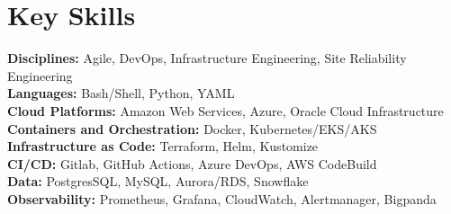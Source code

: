 \documentclass[letterpaper,10.5pt]{article}
\makeatletter
\newcommand{\resumeItem}[1]{
  \item\small{
    {#1 \vspace{-2pt}}
  }
}
\newcommand{\resumeProjectHeading}[2]{
    \vspace{-2pt}\item
    \begin{tabular*}{0.97\textwidth}{l@{\extracolsep{\fill}}r}
      \small#1 & #2 \\
    \end{tabular*}\vspace{-7pt}
}
\newcommand{\resumeSubHeadingListStart}{\begin{itemize}[leftmargin=0.15in, label={}]}
\newcommand{\resumeSubHeadingListEnd}{\end{itemize}}
\newcommand{\resumeItemListStart}{\begin{itemize}}
\newcommand{\resumeItemListEnd}{\end{itemize}\vspace{-5pt}}
\makeatother
\begin{document}
\section{Key Skills}
  \vspace{2pt}
  \resumeSubHeadingListStart
    \small{\item{
        \textbf{Disciplines:}{ Agile, DevOps, Infrastructure Engineering, Site Reliability Engineering} \\ \vspace{3pt}
        \textbf{Languages:}{ Bash/Shell, Python, YAML} \\ \vspace{3pt}
        \textbf{Cloud Platforms:}{ Amazon Web Services, Azure, Oracle Cloud Infrastructure} \\ \vspace{3pt}
        \textbf{Containers and Orchestration:}{ Docker, Kubernetes/EKS/AKS } \\ \vspace{3pt}
        \textbf{Infrastructure as Code:}{ Terraform, Helm, Kustomize} \\ \vspace{3pt}
        \textbf{CI/CD:}{ Gitlab, GitHub Actions, Azure DevOps, AWS CodeBuild} \\ \vspace{3pt}
        \textbf{Data:}{ PostgresSQL, MySQL, Aurora/RDS, Snowflake} \\ \vspace{3pt}   
        \textbf{Observability:}{ Prometheus, Grafana, CloudWatch, Alertmanager, Bigpanda} \\ \vspace{3pt}
    }}
  \resumeSubHeadingListEnd



      
           
\end{document}
